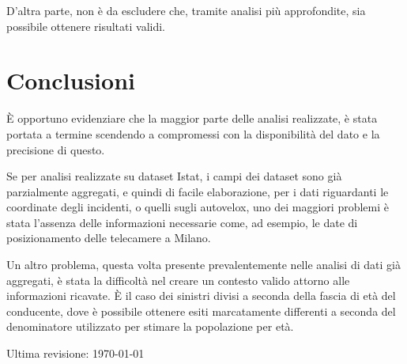 \documentclass[a4paper]{article}
\begin{document}
D'altra parte, non è da escludere che, tramite analisi più approfondite, 
sia possibile ottenere risultati validi.

\section{Conclusioni}

\`E opportuno evidenziare che la maggior parte delle analisi realizzate, 
è stata portata a termine scendendo a compromessi con la disponibilità del dato e la 
precisione di questo. 


Se per analisi realizzate su dataset Istat, i campi dei dataset sono già 
parzialmente aggregati, e quindi di facile elaborazione, 
per i dati riguardanti le coordinate degli incidenti, 
o quelli sugli autovelox, uno dei maggiori problemi è stata l'assenza delle 
informazioni necessarie come, ad esempio, le date di 
posizionamento delle telecamere a Milano. 


Un altro problema, questa volta presente prevalentemente nelle analisi di dati già aggregati, 
è stata la difficoltà nel creare un contesto valido attorno alle informazioni ricavate. 
\`E il caso dei sinistri divisi a seconda della fascia di età del conducente, dove è possibile 
ottenere esiti marcatamente differenti a seconda del denominatore utilizzato per 
stimare la popolazione per età.

\printbibliography

\raggedleft\vfill\scriptsize Ultima revisione: \today\par
\end{document}

